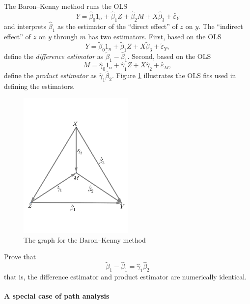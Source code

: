 The Baron--Kenny method runs the OLS
$$
Y = \hat{\beta}_0 1_n   +  \hat{\beta}_1 Z  + \hat{\beta}_2 M  + X \hat{\beta}_3 + \hat{\varepsilon}_Y
$$
and interprets $\hat{\beta}_1$ as the estimator of the ``direct effect'' of $z$ on $y$. 
The ``indirect effect'' of $z$ on $y$ through $m$ has two estimators. First, based on the OLS
$$
Y = \tilde{\beta}_0 1_n   +  \tilde{\beta}_1 Z     + X \tilde{\beta}_3 + \tilde{\varepsilon}_Y,
$$
define the {\it difference estimator} as 
$
 \tilde{\beta}_1 -   \hat{\beta}_1 .
$
Second, based on the OLS
$$
M = \hat{\gamma}_0 1_n   +  \hat{\gamma}_1 Z    + X \hat{\gamma}_2 + \hat{\varepsilon}_M , 
$$
define the {\it product estimator} as
$
  \hat{\gamma}_1   \hat{\beta}_2 .
$
Figure \ref{fig::bkmethod} illustrates the OLS fits used in defining the estimators. 

\begin{figure}
\centering
\includegraphics[width = 0.5\textwidth]{figures/baronkennygraph.pdf}
\caption{The graph for the Baron--Kenny method}\label{fig::bkmethod}
\end{figure} 


Prove that 
$$ 
\tilde{\beta}_1 -   \hat{\beta}_1 =    \hat{\gamma}_1   \hat{\beta}_2
$$ 
that is, the difference estimator and product estimator are numerically identical. 



\paragraph{A special case of path analysis}\label{hw07cochran::path}



